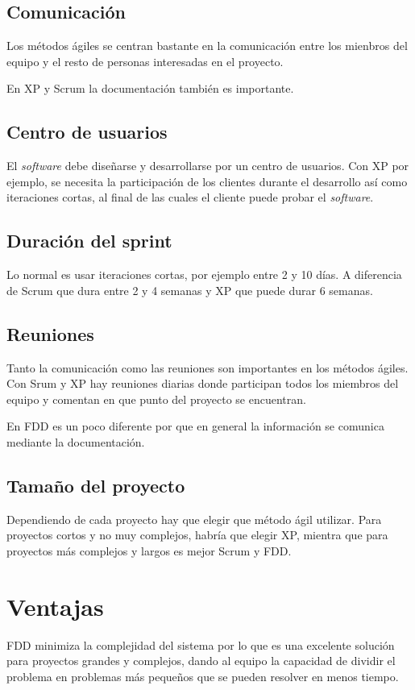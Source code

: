 \documentclass[11pt]{article}
\begin{document}
\subsection*{Comunicación}
Los métodos ágiles se centran bastante en la comunicación entre los mienbros del equipo y el resto de personas interesadas en el proyecto.

En XP y Scrum la documentación también es importante.

\subsection*{Centro de usuarios}

El \textit{software} debe diseñarse y desarrollarse por un centro de usuarios. Con XP por ejemplo, se necesita la participación de los clientes durante el desarrollo así como iteraciones cortas, al final de las cuales el cliente puede probar el \textit{software}.

\subsection*{Duración del sprint}
Lo normal es usar iteraciones cortas, por ejemplo entre 2 y 10 días. A diferencia de Scrum que dura entre 2 y 4 semanas y XP que puede durar 6 semanas.

\subsection*{Reuniones}
Tanto la comunicación como las reuniones son importantes en los métodos ágiles. Con Srum y XP hay reuniones diarias donde participan todos los miembros del equipo y comentan en que punto del proyecto se encuentran. 

En FDD es un poco diferente por que en general la información se comunica mediante la documentación.

\subsection*{Tamaño del proyecto}

Dependiendo de cada proyecto hay que elegir que método ágil utilizar. Para proyectos cortos y no muy complejos, habría que elegir XP, mientra que para proyectos más complejos y largos es mejor Scrum y FDD.


\section{Ventajas}
FDD minimiza la complejidad del sistema por lo que es una excelente solución para proyectos grandes y complejos, dando al equipo la capacidad de dividir el problema en problemas más pequeños que se pueden resolver en menos tiempo.
\end{document}
